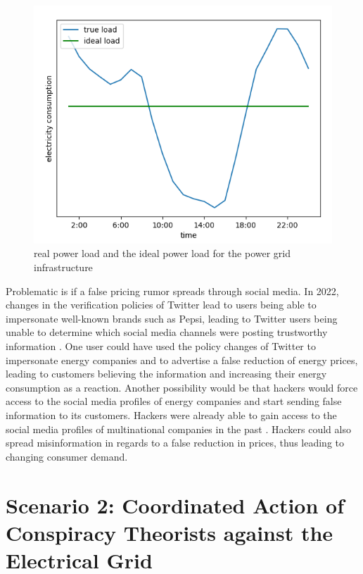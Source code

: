 \begin{figure}[!ht]
    \center
    \includegraphics[scale=.75]{figs/duckcurve.png}
    \caption{real power load and the ideal power load for the 
    power grid infrastructure}
    \label{duckcurve}
\end{figure}

Problematic is if a false pricing rumor spreads through social media.
In 2022, changes in the verification policies of Twitter lead to users being able 
to impersonate well-known brands such as Pepsi, leading to Twitter 
users being unable to determine which social media channels were
posting trustworthy information \cite{twitterchaos}. One user could
have used the policy changes of Twitter to impersonate energy companies
and to advertise a false reduction of energy prices, leading to customers
believing the information and increasing their energy consumption as a 
reaction. Another possibility would be that hackers would force access to the
social media profiles of energy companies and start sending false 
information to its customers. Hackers were already able to gain access
to the social media profiles of multinational companies in the past
\cite{twitterhacker}. Hackers could also spread misinformation in regards
to a false reduction in prices, thus leading to changing consumer demand.




\section{Scenario 2: Coordinated Action of Conspiracy Theorists 
against the Electrical Grid}


